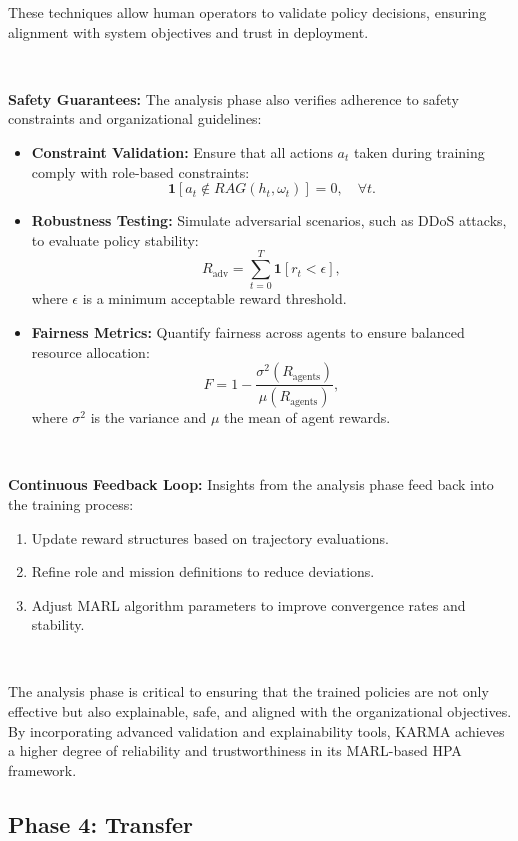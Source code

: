\documentclass[conference]{IEEEtran}
\begin{document}
These techniques allow human operators to validate policy decisions, ensuring alignment with system objectives and trust in deployment.

\

\noindent\textbf{Safety Guarantees:} 
The analysis phase also verifies adherence to safety constraints and organizational guidelines:
\begin{itemize}
    \item \textbf{Constraint Validation:} Ensure that all actions $a_t$ taken during training comply with role-based constraints:
    \[
    \mathbf{1}[a_t \notin RAG(h_t, \omega_t)] = 0, \quad \forall t.
    \]
    \item \textbf{Robustness Testing:} Simulate adversarial scenarios, such as DDoS attacks, to evaluate policy stability:
    \[
    R_{\text{adv}} = \sum_{t=0}^T \mathbf{1}[r_t < \epsilon],
    \]
    where $\epsilon$ is a minimum acceptable reward threshold.
    \item \textbf{Fairness Metrics:} Quantify fairness across agents to ensure balanced resource allocation:
    \[
    F = 1 - \frac{\sigma^2(R_{\text{agents}})}{\mu(R_{\text{agents}})},
    \]
    where $\sigma^2$ is the variance and $\mu$ the mean of agent rewards.
\end{itemize}

\

\noindent\textbf{Continuous Feedback Loop:}
Insights from the analysis phase feed back into the training process:
\begin{enumerate}
    \item Update reward structures based on trajectory evaluations.
    \item Refine role and mission definitions to reduce deviations.
    \item Adjust MARL algorithm parameters to improve convergence rates and stability.
\end{enumerate}

\

The analysis phase is critical to ensuring that the trained policies are not only effective but also explainable, safe, and aligned with the organizational objectives. By incorporating advanced validation and explainability tools, KARMA achieves a higher degree of reliability and trustworthiness in its MARL-based HPA framework.


\subsection{Phase 4: Transfer}
\end{document}
